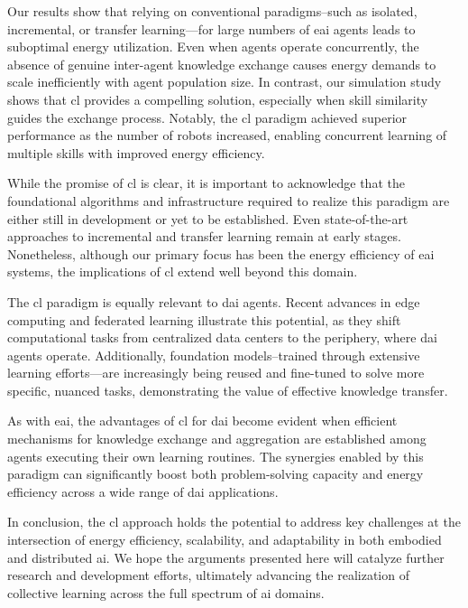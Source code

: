 \documentclass[12pt]{article}
\begin{document}
Our results show that relying on conventional paradigms--such as isolated, incremental, or transfer learning---for large numbers of \ac{eai} agents leads to suboptimal energy utilization. Even when agents operate concurrently, the absence of genuine inter-agent knowledge exchange causes energy demands to scale inefficiently with agent population size. In contrast, our simulation study shows that \ac{cl} provides a compelling solution, especially when skill similarity guides the exchange process. Notably, the \ac{cl} paradigm achieved superior performance as the number of robots increased, enabling concurrent learning of multiple skills with improved energy efficiency.

While the promise of \ac{cl} is clear, it is important to acknowledge that the foundational algorithms and infrastructure required to realize this paradigm are either still in development or yet to be established. Even state-of-the-art approaches to incremental and transfer learning remain at early stages. Nonetheless, although our primary focus has been the energy efficiency of \ac{eai} systems, the implications of \ac{cl} extend well beyond this domain.

The \ac{cl} paradigm is equally relevant to \ac{dai} agents. Recent advances in edge computing and federated learning illustrate this potential, as they shift computational tasks from centralized data centers to the periphery, where \ac{dai} agents operate. Additionally, foundation models--trained through extensive learning efforts---are increasingly being reused and fine-tuned to solve more specific, nuanced tasks, demonstrating the value of effective knowledge transfer.

As with \ac{eai}, the advantages of \ac{cl} for \ac{dai} become evident when efficient mechanisms for knowledge exchange and aggregation are established among agents executing their own learning routines. The synergies enabled by this paradigm can significantly boost both problem-solving capacity and energy efficiency across a wide range of \ac{dai} applications.

In conclusion, the \acl{cl} approach holds the potential to address key challenges at the intersection of energy efficiency, scalability, and adaptability in both embodied and distributed \ac{ai}. We hope the arguments presented here will catalyze further research and development efforts, ultimately advancing the realization of collective learning across the full spectrum of \ac{ai} domains.
\end{document}
